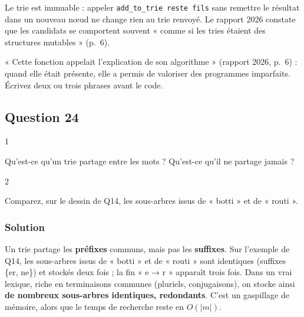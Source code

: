 \documentclass[11pt,a4paper]{article}
\begin{document}
\begin{piege}

Le trie est immuable : appeler \texttt{add\_to\_trie\ reste\ fils} sans remettre le résultat dans un nouveau nœud ne change rien au trie renvoyé. Le rapport 2026 constate que les candidats se comportent souvent « comme si les tries étaient des structures mutables » (p.~6).

\end{piege}

\begin{jury}

« Cette fonction appelait l'explication de son algorithme » (rapport 2026, p.~6) : quand elle était présente, elle a permis de valoriser des programmes imparfaits. Écrivez deux ou trois phrases avant le code.

\end{jury}

\hypertarget{question-24}{%
\subsection{Question 24}\label{question-24}}

\begin{indication}{1}

Qu'est-ce qu'un trie partage entre les mots ? Qu'est-ce qu'il ne partage jamais ?

\end{indication}

\begin{indication}{2}

Comparez, sur le dessin de Q14, les sous-arbres issus de « botti » et de « routi ».

\end{indication}

\hypertarget{solution-23}{%
\subsubsection{Solution}\label{solution-23}}

Un trie partage les \textbf{préfixes} communs, mais pas les \textbf{suffixes}. Sur l'exemple de Q14, les sous-arbres issus de « botti » et de « routi » sont identiques (suffixes \{er, ne\}) et stockés deux fois ; la fin « e → r » apparaît trois fois. Dans un vrai lexique, riche en terminaisons communes (pluriels, conjugaisons), on stocke ainsi \textbf{de nombreux sous-arbres identiques, redondants}. C'est un gaspillage de mémoire, alors que le temps de recherche reste en \(O(|m|)\).
\end{document}
